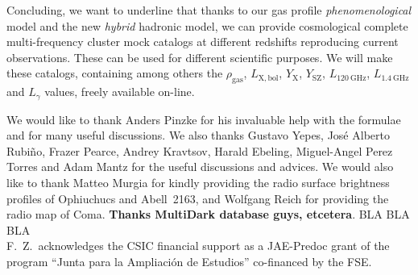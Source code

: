 \documentclass[traditabstract]{aa}
\newcommand{\rmn}{\mathrm}
\begin{document}
Concluding, we want to underline that thanks to our gas profile \emph{phenomenological} model and the new \emph{hybrid} hadronic model, we can provide cosmological complete multi-frequency cluster mock catalogs at different redshifts reproducing current observations. These can be used for different scientific purposes. We will make these catalogs, containing among others the $\rho_{\rmn{gas}}$, $L_{\rmn{X, bol}}$, $Y_{\rmn{X}}$, $Y_{\rmn{SZ}}$, $L_{120~\rmn{GHz}}$, $L_{1.4~\rmn{GHz}}$ and $L_{\gamma}$ values, freely available on-line.


\begin{acknowledgements}
We would like to thank Anders Pinzke for his invaluable help with the formulae and for many useful discussions. We also thanks Gustavo Yepes, Jos\'e Alberto Rubi\~no, Frazer Pearce, Andrey Kravtsov, Harald Ebeling, Miguel-Angel Perez Torres and Adam Mantz for the useful discussions and advices. We would also like to thank Matteo Murgia for kindly providing the radio surface brightness profiles of Ophiuchucs and Abell~2163, and Wolfgang Reich for providing the radio map of Coma. {\bf Thanks MultiDark database guys, etcetera}.
BLA BLA BLA\\ 
F.~Z.~acknowledges the CSIC financial support as a JAE-Predoc grant of the program ``Junta para la Ampliaci\'on de Estudios'' co-financed by the FSE.
\end{acknowledgements}




\end{document}
